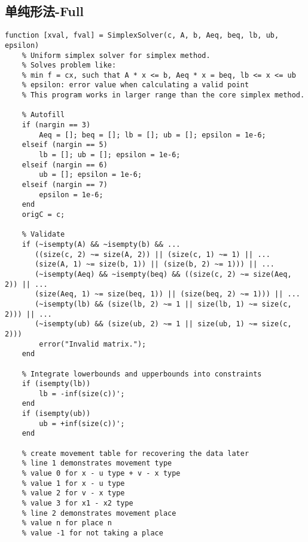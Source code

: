 \documentclass[bwprint, withouttitlepage]{mathexpthesis}
\begin{document}
\subsection{单纯形法-Full}
\begin{verbatim}
function [xval, fval] = SimplexSolver(c, A, b, Aeq, beq, lb, ub, epsilon)
    % Uniform simplex solver for simplex method.
    % Solves problem like:
    % min f = cx, such that A * x <= b, Aeq * x = beq, lb <= x <= ub
    % epsilon: error value when calculating a valid point
    % This program works in larger range than the core simplex method.

    % Autofill
    if (nargin == 3)
        Aeq = []; beq = []; lb = []; ub = []; epsilon = 1e-6;
    elseif (nargin == 5)
        lb = []; ub = []; epsilon = 1e-6;
    elseif (nargin == 6)
        ub = []; epsilon = 1e-6;
    elseif (nargin == 7)
        epsilon = 1e-6;
    end
    origC = c;
    
    % Validate
    if (~isempty(A) && ~isempty(b) && ... 
       ((size(c, 2) ~= size(A, 2)) || (size(c, 1) ~= 1) || ...
       (size(A, 1) ~= size(b, 1)) || (size(b, 2) ~= 1))) || ...
       (~isempty(Aeq) && ~isempty(beq) && ((size(c, 2) ~= size(Aeq, 2)) || ...
       (size(Aeq, 1) ~= size(beq, 1)) || (size(beq, 2) ~= 1))) || ...
       (~isempty(lb) && (size(lb, 2) ~= 1 || size(lb, 1) ~= size(c, 2))) || ...
       (~isempty(ub) && (size(ub, 2) ~= 1 || size(ub, 1) ~= size(c, 2)))
        error("Invalid matrix.");
    end
    
    % Integrate lowerbounds and upperbounds into constraints
    if (isempty(lb))
        lb = -inf(size(c))';
    end
    if (isempty(ub))
        ub = +inf(size(c))';
    end
    
    % create movement table for recovering the data later
    % line 1 demonstrates movement type 
    % value 0 for x - u type + v - x type
    % value 1 for x - u type
    % value 2 for v - x type
    % value 3 for x1 - x2 type
    % line 2 demonstrates movement place
    % value n for place n
    % value -1 for not taking a place
    

\end{verbatim}
\end{document}

